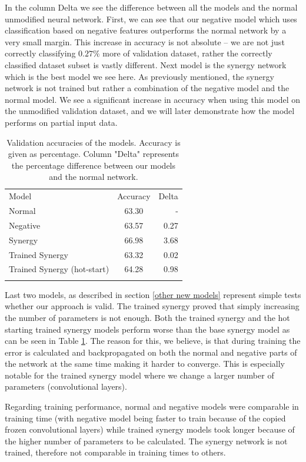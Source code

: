 \documentclass[b5paper]{book}
\begin{document}
In the column Delta we see the difference between all the models and the normal unmodified neural network. First, we can see that our negative model which uses classification based on negative features outperforms the normal network by a very small margin. This increase in accuracy is not absolute -- we are not just correctly classifying \(0.27\%\) more of validation dataset, rather the correctly classified dataset subset is vastly different. Next model is the synergy network which is the best model we see here. As previously mentioned, the synergy network is not trained but rather a combination of the negative model and the normal model. We see a significant increase in accuracy when using this model on the unmodified validation dataset, and we will later demonstrate how the model performs on partial input data.

\begin{table}
\centering
\caption{Validation accuracies of the models. Accuracy is given as percentage. Column "Delta" represents the percentage difference between our models and the normal network.}
\label{tab:6}
\begin{tabular}{lcr}
\hline\noalign{\smallskip}
Model & Accuracy & Delta\\
\noalign{\smallskip}\hline\noalign{\smallskip}
Normal & 63.30 & - \\
Negative & 63.57 & 0.27 \\
Synergy & 66.98 & 3.68 \\
Trained Synergy & 63.32 & 0.02 \\
Trained Synergy (hot-start) & 64.28 & 0.98 \\
\noalign{\smallskip}\hline
\end{tabular}
\end{table}

Last two models, as described in section \ref{other new models} represent simple tests whether our approach is valid. The trained synergy proved that simply increasing the number of parameters is not enough. Both the trained synergy and the hot starting trained synergy models perform worse than the base synergy model as can be seen in Table \ref{tab:6}. The reason for this, we believe, is that during training the error is calculated and backpropagated on both the normal and negative parts of the network at the same time making it harder to converge. This is especially notable for the trained synergy model where we change a larger number of parameters (convolutional layers). 

Regarding training performance, normal and negative models were comparable in training time (with negative model being faster to train because of the copied frozen convolutional layers) while trained synergy models took longer because of the higher number of parameters to be calculated. The synergy network is not trained, therefore not comparable in training times to others.
\end{document}
